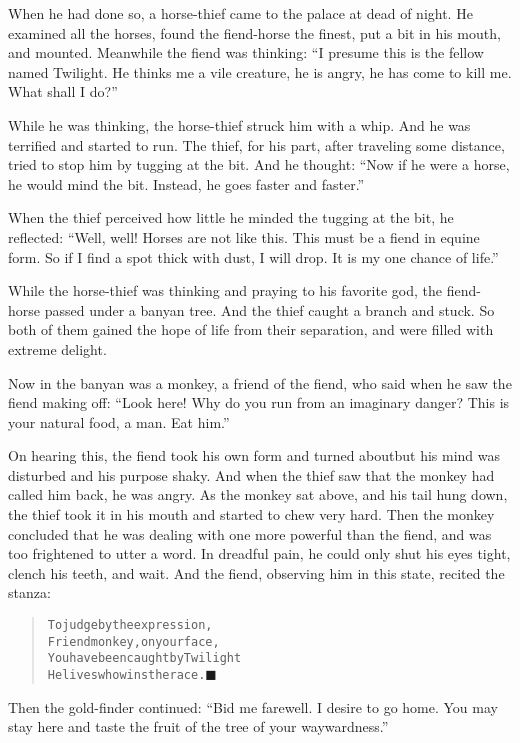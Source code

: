 \documentclass[article, twoside, 14pt]{memoir}
\newcommand{\qed}{\hfill \ensuremath{\blacksquare}}
\renewenvironment{verbatim}{%
\begin{quote}%
\vskip -10pt%
\begin{alltt}\normalfont\large}{\end{alltt}%
\end{quote}%
\vskip -10pt
} %
\begin{document}
When he had done so, a horse-thief came to the palace at dead of
night. He examined all the horses, found the fiend-horse the
finest, put a bit in his mouth, and mounted. Meanwhile the fiend
was thinking:
``I presume this is the fellow named Twilight. He thinks me a vile creature, he is angry, he has come to kill me. What shall I do?''

While he was thinking, the horse-thief struck him with a whip. And
he was terrified and started to run. The thief, for his part, after
traveling some distance, tried to stop him by tugging at the bit.
And he thought:
``Now if he were a horse, he would mind the bit. Instead, he goes faster and faster.''

When the thief perceived how little he minded the tugging at
the bit, he reflected:
``Well, well! Horses are not like this. This must be a fiend in equine form. So if I find a spot thick with dust, I will drop. It is my one chance of life.''

While the horse-thief was thinking and praying to his favorite god,
the fiend-horse passed under a banyan tree. And the thief caught a
branch and stuck. So both of them gained the hope of life from
their separation, and were filled with extreme delight.

Now in the banyan was a monkey, a friend of the fiend, who said
when he saw the fiend making off:
``Look here! Why do you run from an imaginary danger? This is your natural food, a man. Eat him.''

On hearing this, the fiend took his own form and turned about{\textemdash}but
his mind was disturbed and his purpose shaky. And when the thief
saw that the monkey had called him back, he was angry. As the
monkey sat above, and his tail hung down, the thief took it in his
mouth and started to chew very hard. Then the monkey concluded that
he was dealing with one more powerful than the fiend, and was too
frightened to utter a word. In dreadful pain, he could only shut
his eyes tight, clench his teeth, and wait. And the fiend,
observing him in this state, recited the stanza:

\begin{verbatim}
To judge by the expression,
    Friend monkey, on your face,
You have been caught by Twilight{\textemdash}
    He lives who wins the race.\hyperref[s88]{\qed}
\end{verbatim}
Then the gold-finder continued:
``Bid me farewell. I desire to go home. You may stay here and taste the fruit of the tree of your waywardness.''
\end{document}
